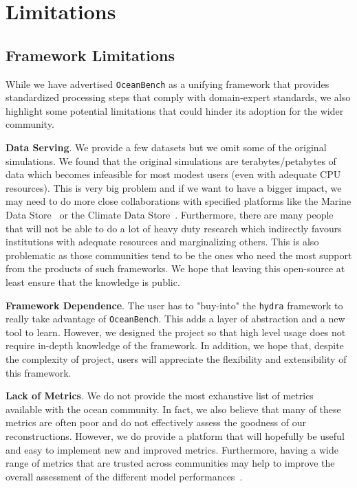 \section{Limitations} \label{sec:appendix_limitations}

\subsection{Framework Limitations}

While we have advertised \texttt{OceanBench} as a unifying framework that provides standardized processing steps that comply with domain-expert standards, we also highlight some potential limitations that could hinder its adoption for the wider community.

\textbf{Data Serving}. We provide a few datasets but we omit some of the original simulations. We found that the original simulations are terabytes/petabytes of data which becomes infeasible for most modest users (even with adequate CPU resources).  
This is very big problem and if we want to have a bigger impact, we may need to do more close collaborations with specified platforms like the Marine Data Store~\citep{MDSOCEANPHYSICS,MDSBIOGEOCHEMICAL,MDSOCEANPHYSICSENS,MDSINSITU,MDSWAVES,MDSALONGTRACK,MDSSSH} or the Climate Data Store~\citep{CDSREANALYSISSST,CDSOBSSST,CDSOBSOC,CDSOBSSSTENS}. Furthermore, there are many people that will not be able to do a lot of heavy duty research which indirectly favours institutions with adequate resources and marginalizing others. 
This is also problematic as those communities tend to be the ones who need the most support from the products of such frameworks.
We hope that leaving this open-source at least ensure that the knowledge is public.

\textbf{Framework Dependence}. The user has to "buy-into" the \texttt{hydra} framework to really take advantage of \texttt{OceanBench}. This adds a layer of abstraction and a new tool to learn. 
However, we designed the project so that high level usage does not require in-depth knowledge of the framework. 
In addition, we hope that, despite the complexity of project, users will appreciate the flexibility and extensibility of this framework.


\textbf{Lack of Metrics}. We do not provide the most exhaustive list of metrics available with the ocean community. In fact, we also believe that many of these metrics are often poor and do not effectively assess the goodness of our reconstructions. 
However, we do provide a platform that will hopefully be useful and easy to implement new and improved metrics.
Furthermore, having a wide range of metrics that are trusted across communities may help to improve the overall assessment of the different model performances~\cite{METRICSAVERAGE}.


